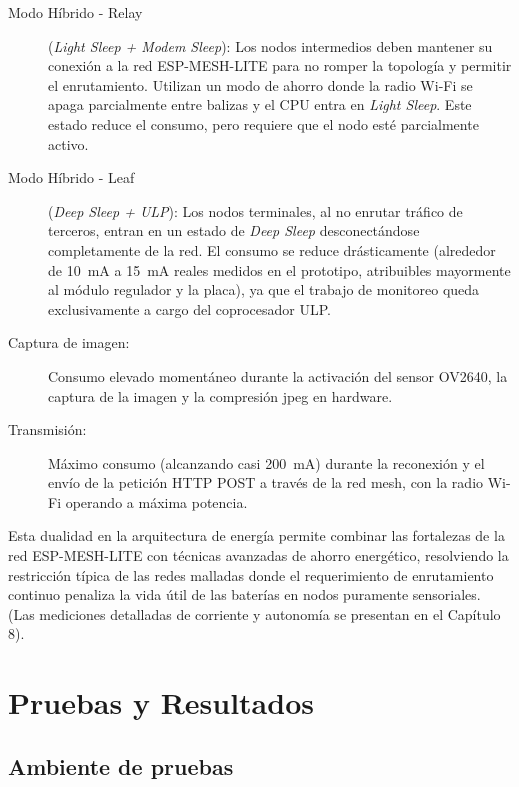 \documentclass[a4paper, 12pt]{report}
\begin{document}
\begin{description}
  \item[Modo Híbrido - Relay] (\textit{Light Sleep + Modem Sleep}): Los nodos intermedios deben mantener su conexión a la red \gls{ESP-MESH-LITE} para no romper la topología y permitir el enrutamiento. Utilizan un modo de ahorro donde la radio Wi-Fi se apaga parcialmente entre balizas y el CPU entra en \textit{Light Sleep}. Este estado reduce el consumo, pero requiere que el nodo esté parcialmente activo.
  \item[Modo Híbrido - Leaf] (\textit{Deep Sleep + ULP}): Los nodos terminales, al no enrutar tráfico de terceros, entran en un estado de \textit{Deep Sleep} desconectándose completamente de la red. El consumo se reduce drásticamente (alrededor de \qty{10}{mA} a \qty{15}{mA} reales medidos en el prototipo, atribuibles mayormente al módulo regulador y la placa), ya que el trabajo de monitoreo queda exclusivamente a cargo del coprocesador ULP.
  \item[Captura de imagen:] Consumo elevado momentáneo durante la activación
    del sensor OV2640, la captura de la imagen y la compresión \gls{jpeg}
    en hardware.
  \item[Transmisión:] Máximo consumo (alcanzando casi \qty{200}{mA}) durante la reconexión y el envío de la petición HTTP POST a través de la red mesh, con la radio Wi-Fi operando a máxima potencia.
\end{description}

Esta dualidad en la arquitectura de energía permite combinar las fortalezas de la red \gls{ESP-MESH-LITE} con técnicas avanzadas de ahorro energético, resolviendo la restricción típica de las redes malladas donde el requerimiento de enrutamiento continuo penaliza la vida útil de las baterías en nodos puramente sensoriales. (Las mediciones detalladas de corriente y autonomía se presentan en el Capítulo 8).

\chapter{Pruebas y Resultados}

\section{Ambiente de pruebas}
\end{document}
